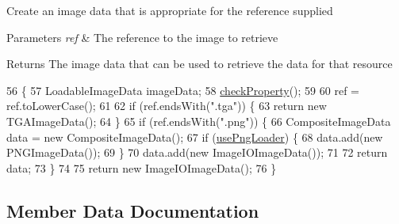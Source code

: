 Create an image data that is appropriate for the reference supplied


\begin{DoxyParams}{Parameters}
{\em ref} & The reference to the image to retrieve \\
\hline
\end{DoxyParams}
\begin{DoxyReturn}{Returns}
The image data that can be used to retrieve the data for that resource 
\end{DoxyReturn}

\begin{DoxyCode}
56                                                                 \{
57         LoadableImageData imageData;
58         \mbox{\hyperlink{classorg_1_1newdawn_1_1slick_1_1opengl_1_1_image_data_factory_a20a3a399bfd4d8bc15a488e3358a3bf4}{checkProperty}}();
59         
60         ref = ref.toLowerCase();
61         
62         \textcolor{keywordflow}{if} (ref.endsWith(\textcolor{stringliteral}{".tga"})) \{
63             \textcolor{keywordflow}{return} \textcolor{keyword}{new} TGAImageData();
64         \} 
65         \textcolor{keywordflow}{if} (ref.endsWith(\textcolor{stringliteral}{".png"})) \{
66             CompositeImageData data = \textcolor{keyword}{new} CompositeImageData();
67             \textcolor{keywordflow}{if} (\mbox{\hyperlink{classorg_1_1newdawn_1_1slick_1_1opengl_1_1_image_data_factory_a75a99eb42388b269c695e0c078c65303}{usePngLoader}}) \{
68                 data.add(\textcolor{keyword}{new} PNGImageData());
69             \}
70             data.add(\textcolor{keyword}{new} ImageIOImageData());
71             
72             \textcolor{keywordflow}{return} data;
73         \} 
74         
75         \textcolor{keywordflow}{return} \textcolor{keyword}{new} ImageIOImageData();
76     \}
\end{DoxyCode}


\subsection{Member Data Documentation}
\mbox{\label{classorg_1_1newdawn_1_1slick_1_1opengl_1_1_image_data_factory_a2604900708ec909187ac502bccfaafa9}} 

